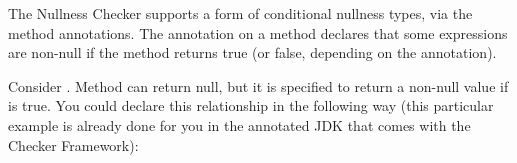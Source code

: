 %



The Nullness Checker supports a form of conditional nullness types, via the
 method annotations.
The annotation on a method declares that some expressions are non-null if
the method returns true (or false, depending on the annotation).

Consider .
Method
can return null, but it is specified to return a non-null value if
 is
true.
You could declare this relationship in the following way (this particular
example is already
done for you in the annotated JDK that comes with the Checker Framework):

